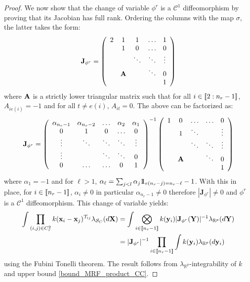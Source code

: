 \begin{proof}
We now show that the change of variable $\phi^r$ is a $\mathcal{C}^1$ diffeomorphism by proving that its Jacobian has full rank. Ordering the columns with the map $\sigma$, the latter takes the form:
\[
    \mathbf{J}_{\phi^r} = \left(
    \begin{array}{ccccc}
    2 & 1 & 1 & \dots & 1 \\
      & 1 & 0 & \dots & 0 \\
      &   & \ddots &  \ddots & \vdots \\
      & \mathbf{A} &   & \ddots & 0 \\
      &               &   &   & 1
    \end{array}
    \right)
\]
where $\mathbf{A}$ is a strictly lower triangular matrix such that for all $i \in {[\![2:n_r-1]\!]}$, $A_{ie(i)} = -1$ and for all $t \neq e(i)$, $A_{it}=0$. The above can be factorized as:
\[
\mathbf{J}_{\phi^r} = 
\left(
    \begin{array}{ccccc}
    \alpha_{n_r-1} & \alpha_{n_r-2} & \dots & \alpha_2 & \alpha_1 \\
    0  & 1 & 0 & \dots & 0 \\
    \vdots & \ddots & \ddots & \ddots & \vdots \\
    \vdots & & \ddots & \ddots & 0 \\
    0 & \dots & \dots & 0 & 1
    \end{array}
    \right)^{-1}
\left(
    \begin{array}{ccccc}
    1 & 0 & \dots & \dots & 0 \\
      & 1 & \ddots & & \vdots\\
      & & \ddots & \ddots & \vdots \\
      & \mathbf{A} & & \ddots & 0 \\
      & & & & 1
    \end{array}
\right)
\]
where $\alpha_{1}=-1$ and for $\ell > 1$, $\alpha_\ell = \sum_{j < l} \alpha_j1\!\!1_{e(n_r - j)=n_r -\ell} - 1$. With this in place, for $i \in {[\![n_r -1]\!]}$, $\alpha_i \neq 0$ in particular $\alpha_{n_r-1} \neq 0$ therefore $|\mathbf{J}_{\phi^r}| \neq 0 $ and $\phi^r$ is a $\mathcal{C}^1$ diffeomorphism. This change of variable yields:
\begin{align*}
\int \prod_{(i,j) \in C_{r}^2} k(\mathbf{x}_{i} - \mathbf{x}_{j})^{\mathcal{T}_{ij}} \lambda_{\mathcal{S}_{C}}(d\mathbf{X}) 
&= \int \bigotimes_{i \in {[\![n_r - 1]\!]}} k(\mathbf{y}_i) |\mathbf{J}_{\phi^r}(\mathbf{Y})|^{-1} \lambda_{\mathbb{R}^p}(d\mathbf{Y}) \\
&= |\mathbf{J}_{\phi^r}|^{-1} \prod_{i \in {[\![n_r - 1]\!]}} \int k(\mathbf{y}_i) \lambda_{\mathbb{R}^p}(d\mathbf{y}_i)
\end{align*}
using the Fubini Tonelli theorem. The result follows from $\lambda_{\mathbb{R}^p}$-integrability of $k$ and upper bound \ref{bound_MRF_product_CC}.
\end{proof}


